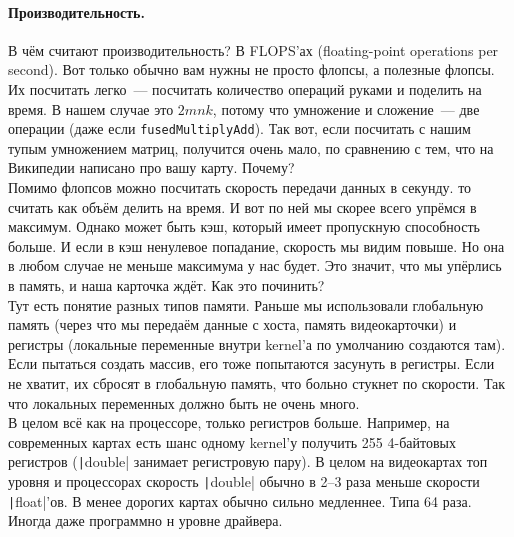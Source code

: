 \documentclass{article}
\begin{document}
    \paragraph{Производительность.}
    В чём считают производительность? В FLOPS'ах (floating-point operations per second). Вот только обычно вам нужны не просто флопсы, а полезные флопсы. Их посчитать легко~--- посчитать количество операций руками и поделить на время. В нашем случае это $2mnk$, потому что умножение и сложение~--- две операции (даже если \Verb|fusedMultiplyAdd|). Так вот, если посчитать с нашим тупым умножением матриц, получится очень мало, по сравнению с тем, что на Википедии написано про вашу карту. Почему?\\
    Помимо флопсов можно посчитать скорость передачи данных в секунду. то считать как объём делить на время. И вот по ней мы скорее всего упрёмся в максимум. Однако может быть кэш, который имеет пропускную способность больше. И если в кэш ненулевое попадание, скорость мы видим повыше. Но она в любом случае не меньше максимума у нас будет. Это значит, что мы упёрлись в память, и наша карточка ждёт. Как это починить?\\
    Тут есть понятие разных типов памяти. Раньше мы использовали глобальную память (через что мы передаём данные с хоста, память видеокарточки) и регистры (локальные переменные внутри kernel'а по умолчанию создаются там). Если пытаться создать массив, его тоже попытаются засунуть в регистры. Если не хватит, их сбросят в глобальную память, что больно стукнет по скорости. Так что локальных переменных должно быть не очень много.\\
    В целом всё как на процессоре, только регистров больше. Например, на современных картах есть шанс одному kernel'у получить 255 4-байтовых регистров (\texttt|double| занимает регистровую пару). В целом на видеокартах топ уровня и процессорах скорость \texttt|double| обычно в 2--3 раза меньше скорости \texttt|float|'ов. В менее дорогих картах обычно сильно медленнее. Типа 64 раза. Иногда даже программно н уровне драйвера.\\
\end{document}
